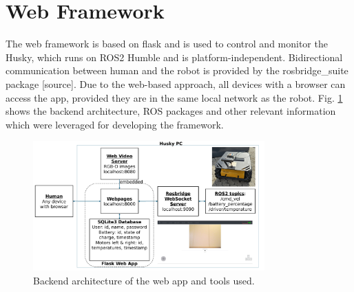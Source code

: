 \documentclass[letterpaper, 10 pt, conference]{ieeeconf}  %
\begin{document}
\section{Web Framework}

The web framework is based on flask and is used to control and monitor the Husky, which runs on ROS2 Humble and is platform-independent. 
Bidirectional communication between human and the robot is provided by the rosbridge\_suite package [source].   
Due to the web-based approach, all devices with a browser can access the app, provided they are in the same local network as the robot.
Fig. \ref{fig:userapp} shows the backend architecture, ROS packages and other relevant information which were leveraged for developing the framework.
\begin{figure}[t]
    \centerline{\includegraphics[width=8.9cm]{images/ROS_Web_App_Architecture.pdf}}
    \caption{Backend architecture of the web app and tools used.}
    \label{fig:userapp}
\end{figure}
\end{document}

